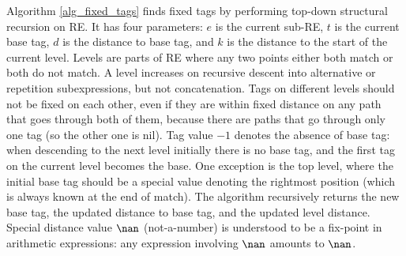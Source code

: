 \documentclass[]{article}
\begin{document}
Algorithm \ref{alg_fixed_tags} finds fixed tags by performing top-down structural recursion on RE.
It has four parameters: $e$ is the current sub-RE, $t$ is the current base tag,
$d$ is the distance to base tag, and $k$ is the distance to the start of the current level.
Levels are parts of RE where any two points either both match or both do not match.
A level increases on recursive descent into alternative or repetition subexpressions, but not concatenation.
Tags on different levels should not be fixed on each other, even if they are within fixed distance on any path that goes through both of them,
because there are paths that go through only one tag (so the other one is nil).
Tag value $-1$ denotes the absence of base tag: when descending to the next level initially there is no base tag, and the first tag on the current level becomes the base.
One exception is the top level, where the initial base tag should be a special value denoting the rightmost position (which is always known at the end of match).
The algorithm recursively returns the new base tag, the updated distance to base tag, and the updated level distance.
Special distance value $\nan$ (not-a-number) is understood to be a fix-point in arithmetic expressions: any expression involving $\nan$ amounts to $\nan$.
\end{document}
